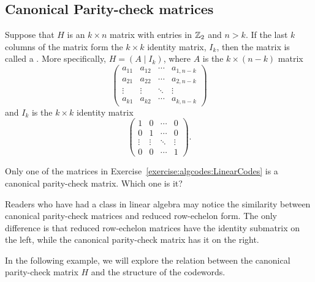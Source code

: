 \subsection{Canonical Parity-check matrices\quad
{}}

\begin{defn}
  Suppose that $H$ is an $k \times n$ matrix with entries in
${\Bbb Z}_2$ and $n > k$. If the last $k$ columns of the
matrix form the $k \times k$ identity matrix, $I_k$, then
the matrix is called a . More specifically, $H= (A \mid I_k
)$, where $A$ is the $k \times (n-k)$ matrix
\[
\left(
\begin{array}{cccc}
a_{11} & a_{12} & \cdots & a_{1,n-k} \\
a_{21} & a_{22} & \cdots & a_{2,n-k} \\
\vdots & \vdots & \ddots & \vdots    \\
a_{k1} & a_{k2} & \cdots & a_{k,n-k}
\end{array}
\right)
\]
and $I_k$ is the $k \times k$ identity matrix
\[
\left(
\begin{array}{cccc}
1 & 0 & \cdots & 0 \\
0 & 1 & \cdots & 0 \\
\vdots & \vdots & \ddots & \vdots \\
0 & 0 & \cdots & 1
\end{array}
\right).
\]
\end{defn}

\begin{exercise}{}
Only one of the matrices in Exercise~\ref{exercise:algcodes:LinearCodes} is a canonical parity-check matrix. Which one is it?
\end{exercise}

Readers who have had a class in linear algebra may notice the similarity between canonical parity-check matrices and reduced row-echelon form. The only difference is that reduced row-echelon matrices have the identity submatrix on the left, while the canonical parity-check matrix has it on the right.

In the following example, we will explore the relation between the canonical parity-check matrix $H$ and the structure of the codewords.
 
